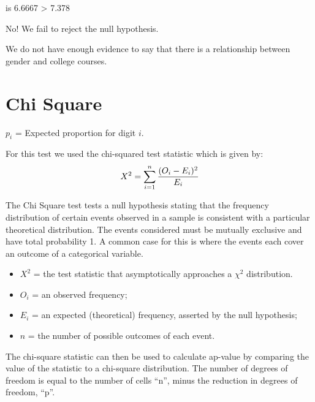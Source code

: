 is 6.6667 > 7.378

No! We fail to reject the null hypothesis.

We do not have enough evidence to say that there is a relationship between gender and college courses.










\section{Chi Square}


$p_{i}$ = Expected proportion for digit $i$.

For this test we used the chi-squared test statistic which is given by:
\begin{equation}
X^2 = \sum_{i=1}^{n} {(O_i - E_i)^2 \over E_i}
\end{equation}


The Chi Square test tests a null hypothesis stating that the frequency distribution of certain events observed in a sample is consistent with a particular theoretical distribution. The events considered must be mutually exclusive and have total probability 1. A common case for this is where the events each cover an outcome of a categorical variable.

\begin{itemize}
	\item $X^2$ = the test statistic that asymptotically approaches a $\chi^2$ distribution.
	\item $O_i$ = an observed frequency;
	\item $E_i$ = an expected (theoretical) frequency, asserted by the null hypothesis;
	\item $n $  = the number of possible outcomes of each event.
\end{itemize}

The chi-square statistic can then be used to calculate ap-value by comparing the value of the statistic to a chi-square distribution. The number of degrees of freedom is equal to the number of cells ``n'', minus the reduction in degrees of freedom, ``p''.




			
